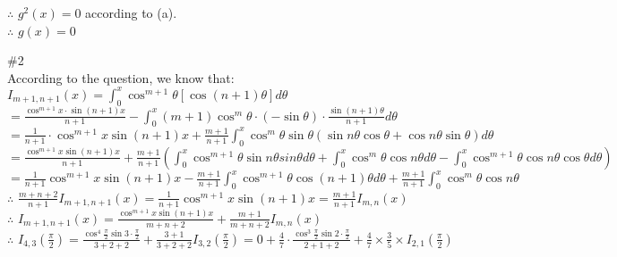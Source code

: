 \documentclass{article}
\begin{document}
$\therefore$ \qquad $g^2(x) = 0$ according to (a).\\

$\therefore$ \qquad $g(x) = 0$\\

\vskip 3cm

\textcolor[rgb]{0.00,0.00,0.50}{\#2}\\

According to the question, we know that:\\

$\displaystyle I_{m+1,n+1}(x) = \int_0^x \cos^{m+1}{\theta} \left[\cos{(n+1) \theta}\right]d\theta$\\

\hskip 1.96cm $\displaystyle = \frac{\cos^{m+1}{x} \cdot \sin{(n+1)x}}{n+1} - \int_0^x (m+1) \cos^m{\theta} \cdot (-\sin{\theta}) \cdot \frac{\sin{(n+1) \theta}}{n+1}d\theta$\\

\hskip 1.96cm $\displaystyle = \frac{1}{n+1} \cdot \cos^{m+1}{x} \sin{(n+1)x} + \frac{m+1}{n+1} \int_0^x \cos^m{\theta} \sin{\theta} (\sin{n\theta} \cos{\theta} + \cos{n\theta} \sin{\theta})d\theta$\\

\hskip 1.96cm $\displaystyle = \frac{\cos^{m+1}{x} \sin{(n+1)x}}{n+1} + \frac{m+1}{n+1} \left(\int_0^x \cos^{m+1}{\theta} \sin{n\theta} sin{\theta} d\theta + \int_0^x\cos^m{\theta} \cos{n\theta} d\theta - \int_0^x \cos^{m+1}{\theta} \cos{n\theta} \cos{\theta} d\theta\right)$\\

\hskip 1.96cm $\displaystyle = \frac{1}{n+1} \cos^{m+1}x \sin{(n+1)x - \frac{m+1}{n+1} \int_0^x \cos^{m+1}\theta} \cos{(n+1)\theta}d\theta + \frac{m+1}{n+1} \int_0^x \cos^m{\theta} \cos{n\theta}$\\

$\therefore$ \qquad $\displaystyle \frac{m+n+2}{n+1} I_{m+1,n+1}(x) = \frac{1}{n+1} \cos^{m+1}x \sin{(n+1)x} = \frac{m+1}{n+1} I_{m,n}(x)$\\

$\therefore$ \qquad $\displaystyle I_{m+1,n+1}(x) = \frac{\cos^{m+1}x \sin{(n+1)x}}{m+n+2} + \frac{m+1}{m+n+2} I_{m,n}(x)$\\

$\therefore$ \qquad $\displaystyle I_{4,3}\left(\frac{\pi}{2}\right) = \frac{\cos^4{\frac{\pi}{2}} \sin{3 \cdot \frac{\pi}{2}}}{3+2+2} +\frac{3+1}{3+2+2} I_{3,2}\left(\frac{\pi}{2}\right) = 0 + \frac{4}{7} \cdot \frac{\cos^3{\frac{\pi}{2}} \sin{2 \cdot \frac{\pi}{2}}}{2+1+2} + \frac{4}{7} \times \frac{3}{5} \times I_{2,1}\left(\frac{\pi}{2}\right)$\\
\end{document}
